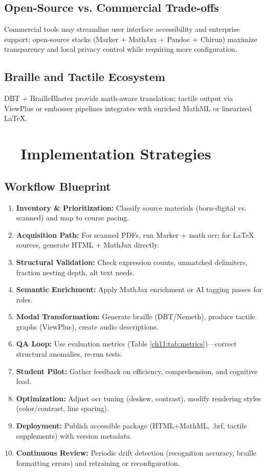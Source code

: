 \subsection{Open-Source vs. Commercial Trade-offs}
Commercial tools may streamline user interface accessibility and enterprise support; open-source stacks (Marker + MathJax + Pandoc + Chirun) maximize transparency and local privacy control while requiring more configuration.

\subsection{Braille and Tactile Ecosystem}
DBT + BrailleBlaster provide math-aware translation; tactile output via ViewPlus or embosser pipelines integrates with enriched \gls{MathML} or linearized LaTeX.\supercite{DuxburyDBT, BrailleBlaster, ViewPlusAGC}

\section{~~Implementation Strategies}\label{ch11:sec:implementation-strategies}

\subsection{Workflow Blueprint}
\begin{enumerate}
	\item \textbf{Inventory \& Prioritization:} Classify source materials (born-digital vs. scanned) and map to course pacing.
	\item \textbf{Acquisition Path:} For scanned PDFs, run Marker + math \gls{ocr}; for LaTeX sources, generate HTML + MathJax directly.\supercite{MarkerDocs}
	\item \textbf{Structural Validation:} Check expression counts, unmatched delimiters, fraction nesting depth, alt text needs.
	\item \textbf{Semantic Enrichment:} Apply MathJax enrichment or AI tagging passes for  roles.\supercite{MathJaxDocs}
	\item \textbf{Modal Transformation:} Generate braille (DBT/Nemeth), produce tactile graphs (ViewPlus), create audio descriptions.
	\item \textbf{QA Loop:} Use evaluation metrics (Table \ref{ch11:tab:metrics})—correct structural anomalies, re-run tests.
	\item \textbf{Student Pilot:} Gather feedback on  efficiency, comprehension, and cognitive load.
	\item \textbf{Optimization:} Adjust \gls{ocr} tuning (deskew, contrast), modify rendering styles (color/contrast, line spacing).
	\item \textbf{Deployment:} Publish accessible package (HTML+MathML, .brf, tactile supplements) with version metadata.
	\item \textbf{Continuous Review:} Periodic drift detection (recognition accuracy, braille formatting errors) and retraining or reconfiguration.
\end{enumerate}

